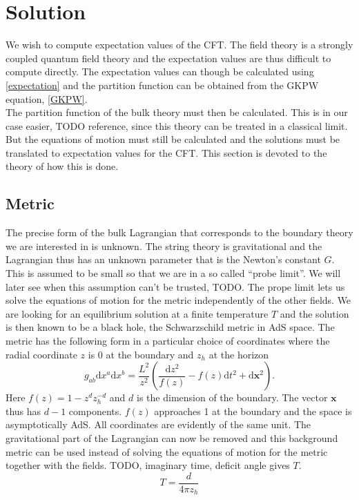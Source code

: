 \documentclass[12pt]{article}
\renewcommand{\d}{\ensuremath{\mathrm{d}}}
\begin{document}
\section{Solution}
We wish to compute expectation values of the CFT. The field theory is a strongly coupled quantum field theory and the expectation values are thus difficult to compute directly. The expectation values can though be calculated using \eqref{expectation} and the partition function can be obtained from the GKPW equation, \eqref{GKPW}.\\

The partition function of the bulk theory must then be calculated. This is in our case easier, TODO reference, since this theory can be treated in a classical limit. But the equations of motion must still be calculated and the solutions must be translated to expectation values for the CFT. This section is devoted to the theory of how this is done.
\subsection{Metric}
The precise form of the bulk Lagrangian that corresponds to the boundary theory we are interested in is unknown. The string theory is gravitational and the Lagrangian thus has an unknown parameter that is the Newton's constant $G$. This is assumed to be small so that we are in a so called ``probe limit''. We will later see when this assumption can't be trusted, TODO. The prope limit lets us solve the equations of motion for the metric independently of the other fields. We are looking for an equilibrium solution at a finite temperature $T$ and the solution is then known to be a black hole, the Schwarzschild metric in AdS space. The metric has the following form in a particular choice of coordinates where the radial coordinate $z$ is 0 at the boundary and $z_h$ at the horizon
\begin{equation}
 g_{ab}\d x^a\d x^b=\frac{L^2}{z^2}\left(\frac{\d z^2}{f(z)}-f(z)\d t^2+\d \mathbf{x}^2\right).\label{metric}
\end{equation}
Here $f(z)=1-z^dz_h^{-d}$ and $d$ is the dimension of the boundary. The vector $\mathbf{x}$ thus has $d-1$ components. $f(z)$ approaches 1 at the boundary and the space is asymptotically AdS. All coordinates are evidently of the same unit. The gravitational part of the Lagrangian can now be removed and this background metric can be used instead of solving the equations of motion for the metric together with the fields. TODO, imaginary time, deficit angle gives $T$.
\begin{equation}
 T=\frac{d}{4\pi  z_h}
\end{equation}
\end{document}
